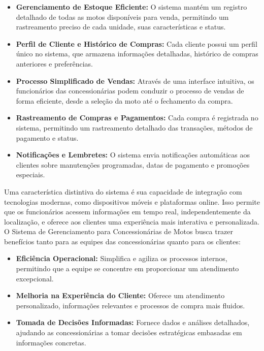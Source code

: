         \begin{itemize}
        	\item \textbf{Gerenciamento de Estoque Eficiente:} O sistema mantém um registro detalhado de todas as motos disponíveis para venda, permitindo um rastreamento preciso de cada unidade, suas características e status.
        	
        	\item \textbf{Perfil de Cliente e Histórico de Compras:} Cada cliente possui um perfil único no sistema, que armazena informações detalhadas, histórico de compras anteriores e preferências.
        	
        	\item \textbf{Processo Simplificado de Vendas:} Através de uma interface intuitiva, os funcionários das concessionárias podem conduzir o processo de vendas de forma eficiente, desde a seleção da moto até o fechamento da compra.
        	
        	\item \textbf{Rastreamento de Compras e Pagamentos:} Cada compra é registrada no sistema, permitindo um rastreamento detalhado das transações, métodos de pagamento e status.
        	
        	\item \textbf{Notificações e Lembretes:} O sistema envia notificações automáticas aos clientes sobre manutenções programadas, datas de pagamento e promoções especiais.
        \end{itemize}
    
        
        	Uma característica distintiva do sistema é sua capacidade de integração com tecnologias modernas, como dispositivos móveis e plataformas online. Isso permite que os funcionários acessem informações em tempo real, independentemente da localização, e oferece aos clientes uma experiência mais interativa e personalizada. O Sistema de Gerenciamento para Concessionárias de Motos busca trazer benefícios tanto para as equipes das concessionárias quanto para os clientes:
        	
        \begin{itemize}
        	\item \textbf{Eficiência Operacional:} Simplifica e agiliza os processos internos, permitindo que a equipe se concentre em proporcionar um atendimento excepcional.
        	
        	\item \textbf{Melhoria na Experiência do Cliente:} Oferece um atendimento personalizado, informações relevantes e processos de compra mais fluidos.
        	
        	\item \textbf{Tomada de Decisões Informadas:} Fornece dados e análises detalhados, ajudando as concessionárias a tomar decisões estratégicas embasadas em informações concretas.
        \end{itemize}
        

